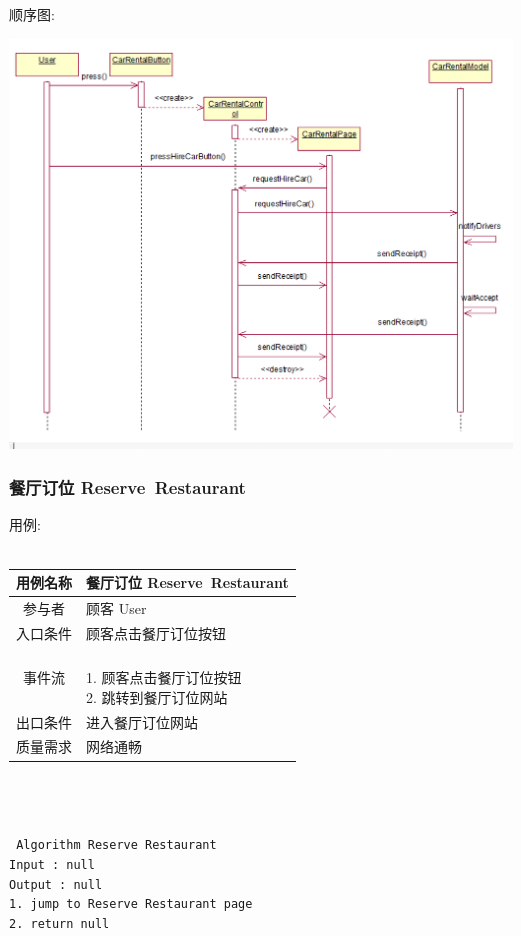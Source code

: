 \documentclass[11pt]{article}
\begin{document}
			顺序图: 
			\begin{center}
			\includegraphics[scale=0.42]{租车服务_顺序图.png}
			\end{center}
			
			
		\subsubsection{餐厅订位 Reserve\ Restaurant}
			用例: \\ \\
			\begin{tabular}{c|l}
			\hline
			用例名称 & 餐厅订位 Reserve\ Restaurant \\ \hline
			参与者 & 顾客 User  \\ \hline
			入口条件 & 顾客点击餐厅订位按钮 \\ \hline
			事件流 & 	\parbox{33em}{\ \\
						1. 顾客点击餐厅订位按钮 \\
						2. 跳转到餐厅订位网站 \\
						} \\ \hline
			出口条件 & 进入餐厅订位网站 \\ \hline
			质量需求 & 网络通畅 \\ \hline
			\end{tabular} \\ \\ \\
			\texttt{
			Algorithm Reserve Restaurant \\
			Input : null \\
			Output : null \\
			1. jump to Reserve Restaurant page \\
			2. return null
			} \\
			
\end{document}
